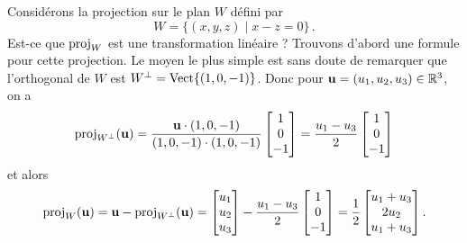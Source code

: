 \begin{myexample} Considérons la projection sur le plan $W$ défini par
$$
W = \{ (x,y,z) \mid x-z = 0\}\,.
$$
Est-ce que $\operatorname{proj}_W$ est une transformation linéaire ? Trouvons d'abord une formule pour cette projection.  Le moyen le plus simple
est sans doute de remarquer que l'orthogonal de $W$ est $W^\perp = \textrm{Vect}\{(1,0,-1)\}$. Donc pour $\mathbf{u} = (u_1,u_2,u_3)\in \mathbb{R}^3$, on a
$$
\operatorname{proj}_{W^\perp}(\mathbf{u}) = \frac{\mathbf{u} \cdot (1,0,-1)}{(1,0,-1)\cdot (1,0,-1)} \left[ \begin{matrix} 1\\0\\-1 \end{matrix} \right]
= \frac{u_1-u_3}{2}\left[ \begin{matrix} 1\\0\\-1 \end{matrix} \right]
$$
et alors
$$
\operatorname{proj}_W(\mathbf{u}) = \mathbf{u} - \operatorname{proj}_{W^\perp}(\mathbf{u}) =\left[ \begin{matrix} u_1\\u_2\\u_3 \end{matrix} \right] - \frac{u_1-u_3}{2}\left[ \begin{matrix} 1\\0\\-1 \end{matrix} \right] = \frac12\left[ \begin{matrix} u_1+u_3\\ 2u_2 \\ u_1+u_3 \end{matrix} \right].
$$


\end{myexample}
